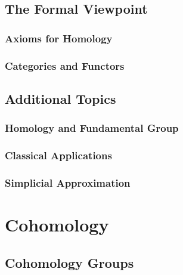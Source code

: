 \documentclass[11pt, a4paper]{article}
\begin{document}
\subsection{The Formal Viewpoint}

\subsubsection{Axioms for Homology}

\subsubsection{Categories and Functors}

\subsection*{Additional Topics}

\subsubsection{Homology and Fundamental Group}

\subsubsection{Classical Applications}

\subsubsection{Simplicial Approximation}

\section{Cohomology}

\subsection{Cohomology Groups}
\end{document}
